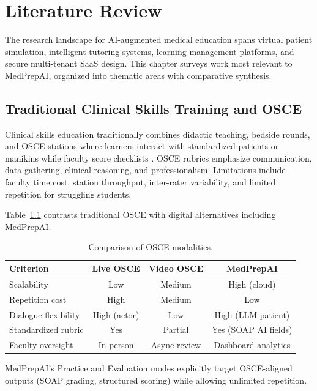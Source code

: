 \chapter{Literature Review}
\label{ch:lit}

The research landscape for AI-augmented medical education spans virtual patient simulation, intelligent tutoring systems, learning management platforms, and secure multi-tenant SaaS design. This chapter surveys work most relevant to MedPrepAI, organized into thematic areas with comparative synthesis.

\section{Traditional Clinical Skills Training and OSCE}
Clinical skills education traditionally combines didactic teaching, bedside rounds, and OSCE stations where learners interact with standardized patients or manikins while faculty score checklists \cite{harden_osce_1975}. OSCE rubrics emphasize communication, data gathering, clinical reasoning, and professionalism. Limitations include faculty time cost, station throughput, inter-rater variability, and limited repetition for struggling students.

Table~\ref{tab:osce-digital} contrasts traditional OSCE with digital alternatives including MedPrepAI.

\begin{table}[htbp]
  \centering
  \caption{Comparison of OSCE modalities.}
  \label{tab:osce-digital}
  \small
  \begin{tabular}{@{}lccc@{}}
    \toprule
    \textbf{Criterion} & \textbf{Live OSCE} & \textbf{Video OSCE} & \textbf{MedPrepAI} \\
    \midrule
    Scalability & Low & Medium & High (cloud) \\
    Repetition cost & High & Medium & Low \\
    Dialogue flexibility & High (actor) & Low & High (LLM patient) \\
    Standardized rubric & Yes & Partial & Yes (SOAP AI fields) \\
    Faculty oversight & In-person & Async review & Dashboard analytics \\
    \bottomrule
  \end{tabular}
\end{table}

MedPrepAI's Practice and Evaluation modes explicitly target OSCE-aligned outputs (SOAP grading, structured scoring) while allowing unlimited repetition.

